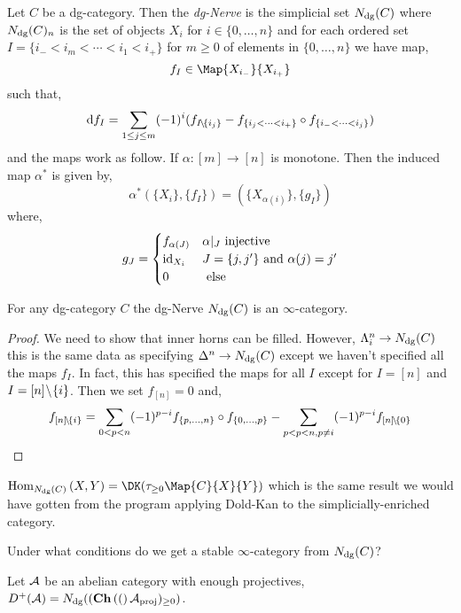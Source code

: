 \documentclass[12pt]{article}
\begin{document}
\begin{defn}
Let $C$ be a dg-category. Then the \textit{dg-Nerve} is the simplicial set $N_{\mathrm{dg}}(C)$ where $N_{\mathrm{dg}}(C)_n$ is the set of objects $X_i$ for $i \in \{ 0, \dots, n \}$ and for each ordered set $I = \{ i_- < i_m < \cdots < i_1 < i_+ \}$ for $m \ge 0$ of elements in $\{ 0, \dots, n \}$ we have map,
\[ f_I \in \Map{X_{i_-}}{X_{i_+}} \]
such that,
\[ \mathrm{d}{f_I} = \sum_{1 \le j \le m} (-1)^i (f_{I \! \setminus \! \{ i_j \}} - f_{\{i_j < \cdots < i_+ \}} \circ f_{\{ i_- < \cdots < i_j \}}) \]
and the maps work as follow. If $\alpha : [m] \to [n]$ is monotone. Then the induced map $\alpha^*$ is given by,
\[ \alpha^* (\{ X_i \}, \{ f_I \}) = (\{ X_{\alpha(i)} \}, \{ g_I \}) \]
where,
\[ 
g_J = 
\begin{cases}
f_{\alpha(J)} & \alpha|_J \text{ injective} 
\\
\mathrm{id}_{X_i} & J = \{ j, j'\} \text{ and } \alpha(j) = j'
\\
0 & \text{ else}
\end{cases} \]
\end{defn}

\begin{prop}
For any dg-category $C$ the dg-Nerve $N_{\mathrm{dg}}(C)$ is an $\infty$-category. 
\end{prop}

\begin{proof}
We need to show that inner horns can be filled. However, $\Lambda^n_i \to N_{\mathrm{dg}}(C)$ this is the same data as specifying $\Delta^n \to N_{\mathrm{dg}}(C)$ except we haven't specified all the maps $f_I$. In fact, this has specified the maps for all $I$ except for $I = [n]$ and $I = [n] \! \setminus \! \{ i \}$. Then we set $f_{[n]} = 0$ and,
\[ f_{[n] \! \setminus \! \{ i \}} = \sum_{0 < p < n} (-1)^{p-i} f_{\{ p, \dots, n \}} \circ f_{\{0, \dots, p\}} - \sum_{p < p < n, p \neq i} (-1)^{p-i} f_{[n] \! \setminus \! \{ 0 \}} \]
\end{proof}

\begin{rmk}
$\Hom{N_{\dg}(C)}{X}{Y} = \DK(\tau_{\ge 0} \Map{C}{X}{Y})$ which is the same result we would have gotten from the program applying Dold-Kan to the simplicially-enriched category.
\end{rmk}

\begin{rmk}
Under what conditions do we get a stable $\infty$-category from $N_{\mathrm{dg}}(C)$?
\end{rmk}

\begin{defn}
Let $\mathcal{A}$ be an abelian category with enough projectives,
$D^+(\mathcal{A}) = N_{\mathrm{dg}}((\mathbf{Ch}\left( ( \right)\mathcal{A}_{\text{proj}})_{\ge 0})$.
\end{defn}
\end{document}
